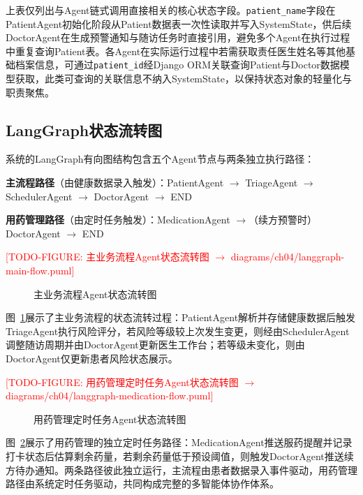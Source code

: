 上表仅列出与Agent链式调用直接相关的核心状态字段。\texttt{patient\_name}字段在PatientAgent初始化阶段从Patient数据表一次性读取并写入SystemState，供后续DoctorAgent在生成预警通知与随访任务时直接引用，避免多个Agent在执行过程中重复查询Patient表。各Agent在实际运行过程中若需获取责任医生姓名等其他基础档案信息，可通过\texttt{patient\_id}经Django ORM关联查询Patient与Doctor数据模型获取，此类可查询的关联信息不纳入SystemState，以保持状态对象的轻量化与职责聚焦。


\subsection{LangGraph状态流转图}

系统的LangGraph有向图结构包含五个Agent节点与两条独立执行路径：

\textbf{主流程路径}（由健康数据录入触发）：PatientAgent $\rightarrow$ TriageAgent $\rightarrow$ SchedulerAgent $\rightarrow$ DoctorAgent $\rightarrow$ END

\textbf{用药管理路径}（由定时任务触发）：MedicationAgent $\rightarrow$（续方预警时）DoctorAgent $\rightarrow$ END

\todofig{}
\textcolor{red}{[TODO-FIGURE: 主业务流程Agent状态流转图 $\rightarrow$ diagrams/ch04/langgraph-main-flow.puml]}
\begin{figure}[H]
\centering
\caption{主业务流程Agent状态流转图}
\label{fig:langgraph-main-flow}
\end{figure}

图~\ref{fig:langgraph-main-flow}展示了主业务流程的状态流转过程：PatientAgent解析并存储健康数据后触发TriageAgent执行风险评分，若风险等级较上次发生变更，则经由SchedulerAgent调整随访周期并由DoctorAgent更新医生工作台；若等级未变化，则由DoctorAgent仅更新患者风险状态展示。

\todofig{}
\textcolor{red}{[TODO-FIGURE: 用药管理定时任务Agent状态流转图 $\rightarrow$ diagrams/ch04/langgraph-medication-flow.puml]}
\begin{figure}[H]
\centering
\caption{用药管理定时任务Agent状态流转图}
\label{fig:langgraph-medication-flow}
\end{figure}

图~\ref{fig:langgraph-medication-flow}展示了用药管理的独立定时任务路径：MedicationAgent推送服药提醒并记录打卡状态后估算剩余药量，若剩余药量低于预设阈值，则触发DoctorAgent推送续方待办通知。两条路径彼此独立运行，主流程由患者数据录入事件驱动，用药管理路径由系统定时任务驱动，共同构成完整的多智能体协作体系。


